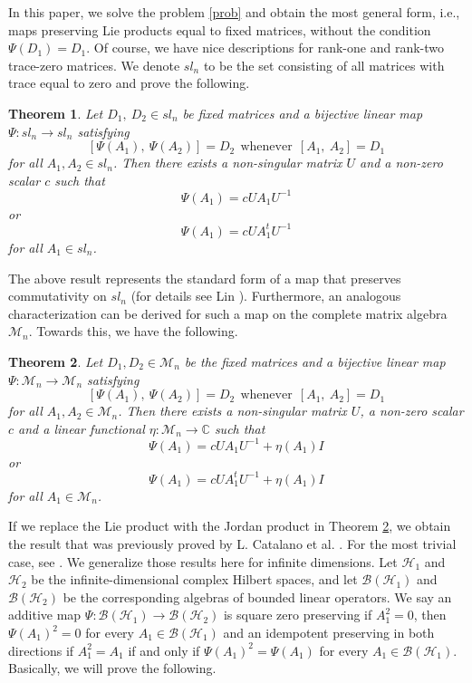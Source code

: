 \documentclass{amsart}
\newtheorem{theorem}{Theorem}[section]
\theoremstyle{definition}
\theoremstyle{remark}
\numberwithin{equation}{section}
\begin{document}
In this paper, we solve the problem \ref{prob} and obtain the most general form, i.e., maps preserving Lie products equal to fixed matrices, without the condition $\Psi(D_1)=D_1$. Of course, we have nice descriptions for rank-one and rank-two trace-zero matrices. We denote $sl_n$ to be the set consisting of all matrices with trace equal to zero and prove the following. \\
\begin{theorem}
    \label{th1}
	Let $D_1,~D_2 \in sl_n$ be fixed matrices and a bijective linear map $\Psi : sl_n \to sl_n$ satisfying $$[\Psi(A_1),~\Psi(A_2)]=D_2 ~~\text{whenever}~~ [A_1,~A_2]=D_1 $$ for all $A_1,A_2 \in sl_n$. Then there exists a non-singular matrix $U$ and a non-zero scalar $c$ such that $$\Psi(A_1)=cUA_1U^{-1}$$ or $$\Psi(A_1)=cUA_1^tU^{-1}$$ for all $A_1 \in sl_n$.
\end{theorem}

The above result represents the standard form of a map that preserves commutativity on $sl_n$ (for details see Lin \cite{Lin}). Furthermore, an analogous characterization can be derived for such a map on the complete matrix algebra $\mathscr{M}_n$. Towards this, we have the following.

\begin{theorem}
	\label{th2}
	Let $D_1,D_2 \in \mathscr{M}_n$ be the fixed matrices and a bijective linear map $\Psi : \mathscr{M}_n \to \mathscr{M}_n$ satisfying $$[\Psi(A_1),~\Psi(A_2)]=D_2 ~~\text{whenever}~~ [A_1,~A_2]=D_1 $$ for all $A_1,A_2 \in \mathscr{M}_n$. Then there exists a non-singular matrix $U$, a non-zero scalar $c$ and a linear functional $\eta : \mathscr{M}_n \to \mathbb{C}$ such that $$\Psi(A_1)=cUA_1U^{-1}+\eta(A_1)I$$ or $$\Psi(A_1)=cUA_1^tU^{-1}+\eta(A_1)I$$ for all $A_1 \in \mathscr{M}_n$.
\end{theorem}

If we replace the Lie product with the Jordan product in Theorem \ref{th2}, we obtain the result that was previously proved by L. Catalano et al. \cite{cat1}. For the most trivial case, see \cite{che}. We generalize those results here for infinite dimensions. Let $\mathscr{H}_1$ and $\mathscr{H}_2$ be the infinite-dimensional complex Hilbert spaces, and let $\mathscr{B}(\mathscr{H}_1)$ and $ \mathscr{B}(\mathscr{H}_2)$ be the corresponding algebras of bounded linear operators. We say an additive map $\Psi: \mathscr{B}(\mathscr{H}_1) \to \mathscr{B}(\mathscr{H}_2)$ is square zero preserving if $A_1^2=0$, then $\Psi(A_1)^2=0$ for every $A_1 \in \mathscr{B}(\mathscr{H}_1)$ and an idempotent preserving in both directions if $A_1^2=A_1$ if and only if $\Psi(A_1)^2=\Psi(A_1)$ for every $A_1 \in \mathscr{B}(\mathscr{H}_1)$. Basically, we will prove the following.
\end{document}
